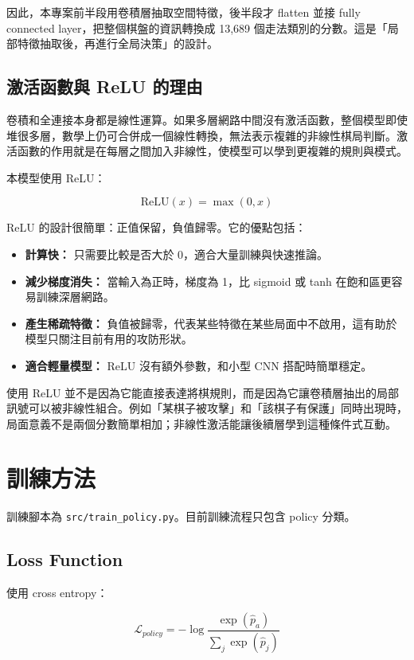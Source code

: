 \documentclass[12pt,a4paper,fontset=none]{ctexart}
\begin{document}
因此，本專案前半段用卷積層抽取空間特徵，後半段才 flatten 並接 fully connected layer，把整個棋盤的資訊轉換成 13,689 個走法類別的分數。這是「局部特徵抽取後，再進行全局決策」的設計。

\subsection{激活函數與 ReLU 的理由}

卷積和全連接本身都是線性運算。如果多層網路中間沒有激活函數，整個模型即使堆很多層，數學上仍可合併成一個線性轉換，無法表示複雜的非線性棋局判斷。激活函數的作用就是在每層之間加入非線性，使模型可以學到更複雜的規則與模式。

本模型使用 ReLU：

\[
\mathrm{ReLU}(x)=\max(0,x)
\]

ReLU 的設計很簡單：正值保留，負值歸零。它的優點包括：

\begin{itemize}
  \item \textbf{計算快：} 只需要比較是否大於 0，適合大量訓練與快速推論。
  \item \textbf{減少梯度消失：} 當輸入為正時，梯度為 1，比 sigmoid 或 tanh 在飽和區更容易訓練深層網路。
  \item \textbf{產生稀疏特徵：} 負值被歸零，代表某些特徵在某些局面中不啟用，這有助於模型只關注目前有用的攻防形狀。
  \item \textbf{適合輕量模型：} ReLU 沒有額外參數，和小型 CNN 搭配時簡單穩定。
\end{itemize}

使用 ReLU 並不是因為它能直接表達將棋規則，而是因為它讓卷積層抽出的局部訊號可以被非線性組合。例如「某棋子被攻擊」和「該棋子有保護」同時出現時，局面意義不是兩個分數簡單相加；非線性激活能讓後續層學到這種條件式互動。

\section{訓練方法}

訓練腳本為 \texttt{src/train\_policy.py}。目前訓練流程只包含 policy 分類。

\subsection{Loss Function}

使用 cross entropy：

\[
\mathcal{L}_{policy}
=
-\log
\frac{\exp(\hat{p}_{a})}
{\sum_j \exp(\hat{p}_j)}
\]
\end{document}
